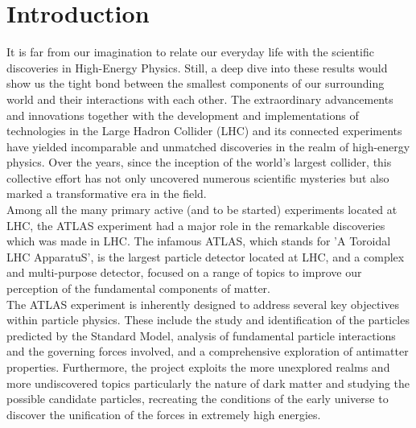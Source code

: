 
\chapter{Introduction} %

\label{Introduction} %


\newcommand{\keyword}[1]{\textbf{#1}}
\newcommand{\tabhead}[1]{\textbf{#1}}
\newcommand{\code}[1]{\texttt{#1}}
\newcommand{\file}[1]{\texttt{\bfseries#1}}
\newcommand{\option}[1]{\texttt{\itshape#1}}


It is far from our imagination to relate our everyday life with the scientific discoveries in High-Energy Physics. Still, a deep dive into these results would show us the tight bond between the smallest components of our surrounding world and their interactions with each other. The extraordinary advancements and innovations together with the development and implementations of technologies in the Large Hadron Collider (LHC) and its connected experiments have yielded incomparable and unmatched discoveries in the realm of high-energy physics. Over the years, since the inception of the world's largest collider, this collective effort has not only uncovered numerous scientific mysteries but also marked a transformative era in the field.\\

Among all the many primary active (and to be started) experiments located at LHC, the ATLAS experiment had a major role in the remarkable discoveries which was made in LHC. The infamous ATLAS, which stands for 'A Toroidal LHC ApparatuS', is the largest particle detector located at LHC, and a complex and multi-purpose detector, focused on a range of topics to improve our perception of the fundamental components of matter.\\
The ATLAS experiment is inherently designed to address several key objectives within particle physics. These include the study and identification of the particles predicted by the Standard Model, analysis of fundamental particle interactions and the governing forces involved, and a comprehensive exploration of antimatter properties. Furthermore, the project exploits the more unexplored realms and more undiscovered topics particularly the nature of dark matter and studying the possible candidate particles, recreating the conditions of the early universe to discover the unification of the forces in extremely high energies.\cite{ATLASweb}\\

